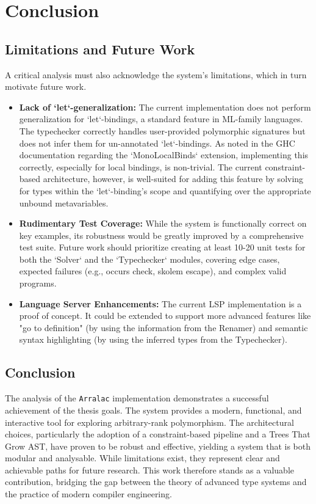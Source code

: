 \chapter{Conclusion}
\label{chap:Conclusion}

\section{Limitations and Future Work}
\label{sec:Discussion:Limitations}
A critical analysis must also acknowledge the system's limitations, which in turn motivate future work.
\begin{itemize}
    \item \textbf{Lack of `let`-generalization:} The current implementation does not perform generalization for `let`-bindings, a standard feature in ML-family languages. The typechecker correctly handles user-provided polymorphic signatures but does not infer them for un-annotated `let`-bindings. As noted in the GHC documentation regarding the `MonoLocalBinds` extension, implementing this correctly, especially for local bindings, is non-trivial. The current constraint-based architecture, however, is well-suited for adding this feature by solving for types within the `let`-binding's scope and quantifying over the appropriate unbound metavariables.

    \item \textbf{Rudimentary Test Coverage:} While the system is functionally correct on key examples, its robustness would be greatly improved by a comprehensive test suite. Future work should prioritize creating at least 10-20 unit tests for both the `Solver` and the `Typechecker` modules, covering edge cases, expected failures (e.g., occurs check, skolem escape), and complex valid programs.

    \item \textbf{Language Server Enhancements:} The current LSP implementation is a proof of concept. It could be extended to support more advanced features like "go to definition" (by using the information from the Renamer) and semantic syntax highlighting (by using the inferred types from the Typechecker).
\end{itemize}

\section{Conclusion}
The analysis of the \texttt{Arralac} implementation demonstrates a successful achievement of the thesis goals. The system provides a modern, functional, and interactive tool for exploring arbitrary-rank polymorphism. The architectural choices, particularly the adoption of a constraint-based pipeline and a Trees That Grow AST, have proven to be robust and effective, yielding a system that is both modular and analysable. While limitations exist, they represent clear and achievable paths for future research. This work therefore stands as a valuable contribution, bridging the gap between the theory of advanced type systems and the practice of modern compiler engineering.